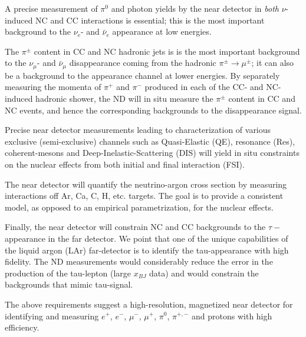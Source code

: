 A precise measurement of $\pi^0$ and photon yields by the near detector in \textit{both}  $\nu$-induced NC and CC interactions is
essential;
this is the most important background to the $\nu_e$- and $\bar \nu_e$ appearance at low energies.



The $\pi^{\pm}$ content in CC and NC hadronic jets is is the most important background to 
the $\nu_\mu$- and $\bar \nu_\mu$ disappearance coming from the hadronic   $\pi^{\pm} \rightarrow \mu^{\pm}$; 
it can also be a background to the appearance channel at lower energies. 
By separately measuring the momenta of $\pi^+$ and $\pi^-$ produced in each of 
the CC- and NC-induced hadronic shower, the ND 
will in situ measure the $\pi^{\pm}$ content in CC and NC events, and hence the corresponding backgrounds 
to the disappearance signal. 



Precise near detector measurements leading to characterization of 
 various exclusive (semi-exclusive) 
channels such as Quasi-Elastic (QE), resonance (Res), 
coherent-mesons and Deep-Inelastic-Scattering (DIS)
will yield  
 in situ constraints on the nuclear effects from both initial and final interaction (FSI). 


The near detector will quantify the neutrino-argon cross section 
by measuring interactions off Ar, Ca, C, H, etc. targets. The goal is to provide 
a consistent model, as opposed to an empirical parametrization, for the nuclear effects. 


Finally, the near detector will constrain NC and CC backgrounds to the $\tau-$ appearance in the far detector. 
We point that one of the unique capabilities of the liquid argon (LAr) far-detector is to identify the 
tau-appearance with high fidelity. The ND measurements would considerably reduce 
the error in the production of the tau-lepton (large $x_{BJ}$ data) and would constrain 
the backgrounds that mimic tau-signal. 

The above requirements suggest a high-resolution, magnetized near detector for identifying and 
measuring $e^+$, $e^-$, $\mu^-$, $\mu^+$, $\pi^0$, $\pi^{+,-}$ and protons  with high efficiency. 



